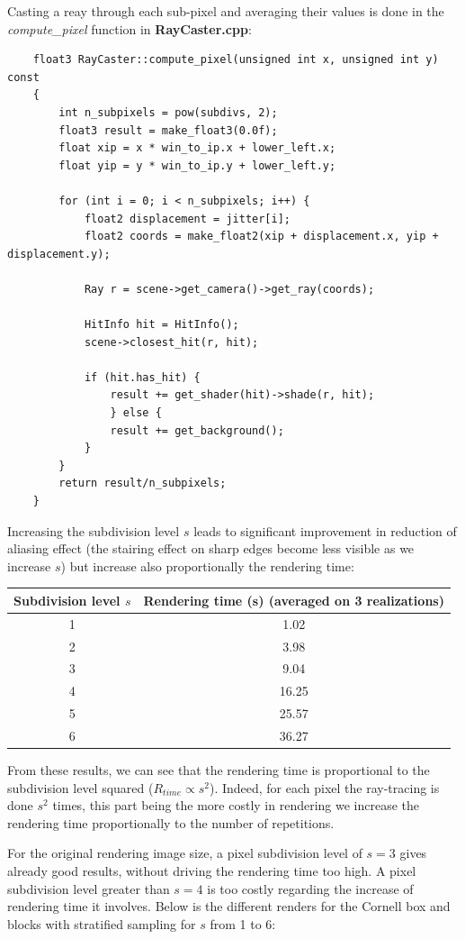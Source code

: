 \documentclass[a4,12pt]{article}
\begin{document}
	Casting a reay through each sub-pixel and averaging their values is done in the \textit{compute\_pixel} function in \textbf{RayCaster.cpp}:
	
	\begin{lstlisting}
	float3 RayCaster::compute_pixel(unsigned int x, unsigned int y) const
	{
		int n_subpixels = pow(subdivs, 2);
		float3 result = make_float3(0.0f);
		float xip = x * win_to_ip.x + lower_left.x;
		float yip = y * win_to_ip.y + lower_left.y;
		
		for (int i = 0; i < n_subpixels; i++) {
			float2 displacement = jitter[i];
			float2 coords = make_float2(xip + displacement.x, yip + displacement.y);
			
			Ray r = scene->get_camera()->get_ray(coords);
			
			HitInfo hit = HitInfo();
			scene->closest_hit(r, hit);
			
			if (hit.has_hit) {
				result += get_shader(hit)->shade(r, hit);
				} else {
				result += get_background();
			}
		}
		return result/n_subpixels;
	}
	\end{lstlisting}
	
	Increasing the subdivision level $s$ leads to significant improvement in reduction of aliasing effect (the stairing effect on sharp edges become less visible as we increase $s$) but increase also proportionally the rendering time:
	
	\begin{center}
	\begin{tabular}{|c|c|}
		\hline
		Subdivision level $s$ & Rendering time (s) (averaged on 3 realizations)\\ \hline
		1 & 1.02\\ \hline
		2 & 3.98\\ \hline
		3 & 9.04\\ \hline
		4 & 16.25\\ \hline
		5 & 25.57\\ \hline
		6 & 36.27\\ \hline
	\end{tabular}
	\end{center}
	
	From these results, we can see that the rendering time is proportional to the subdivision level squared ($R_{time} \propto s^2$). Indeed, for each pixel the ray-tracing is done $s^2$ times, this part being the more costly in rendering we increase the rendering time proportionally to the number of repetitions.
	
	For the original rendering image size, a pixel subdivision level of $s = 3$ gives already good results, without driving the rendering time too high. A pixel subdivision level greater than $s = 4$ is too costly regarding the increase of rendering time it involves. Below is the different renders for the Cornell box and blocks with stratified sampling for $s$ from 1 to 6:
	
\end{document}
